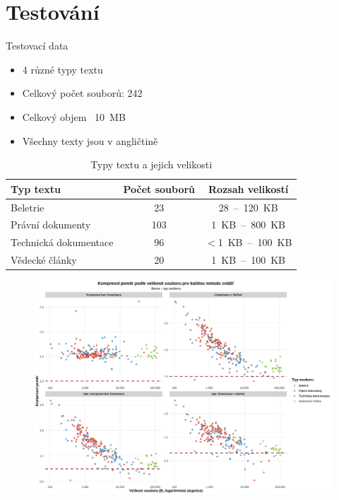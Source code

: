 \documentclass[lualatex,hyperref={pdfencoding=auto}]{beamer}
\begin{document}
\section{Testování}

\begin{frame}{Testovací data}
      \begin{itemize}
        \item 4 různé typy textu
        \item Celkový počet souborů: 242
        \item Celkový objem ~10~MB
        \item Všechny texty jsou v angličtině
      \end{itemize}
      \vspace{12pt}
    \begin{table}[ht]
      \centering
      \begin{tabular}{|l|c|c|}
        \hline
        \textbf{Typ textu} & \textbf{Počet souborů} & \textbf{Rozsah velikostí} \\
        \hline
        Beletrie & 23 & 28~--~120~KB \\
        Právní dokumenty & 103 & 1~KB~--~800~KB \\
        Technická dokumentace & 96 & $<$1~KB~--~100~KB \\
        Vědecké články & 20 & 1~KB~--~100~KB \\
        \hline
      \end{tabular}
      \caption{Typy textu a jejich velikosti}
    \end{table}
\end{frame}


\begin{frame}
  \begin{figure}
    \centering
    \includegraphics[width=\textwidth]{fig/compression_ratio_by_size_per_method.pdf}
    \label{fig:compression_ratio_by_size_per_method}
  \end{figure}
\end{frame}
\end{document}
